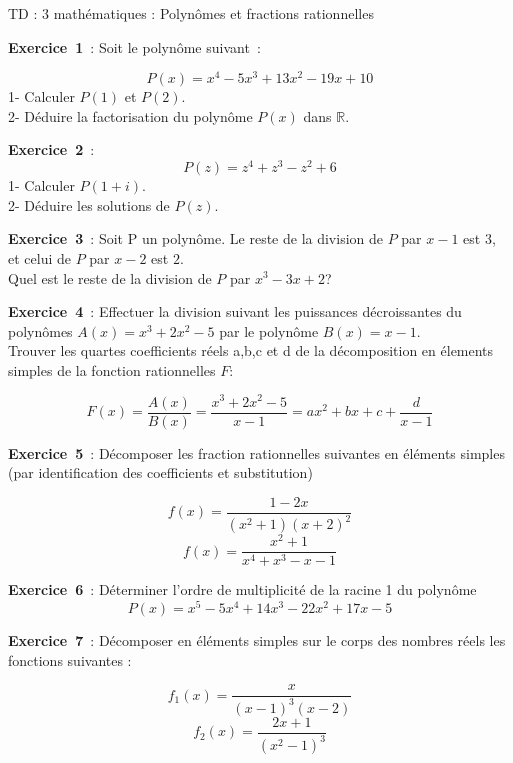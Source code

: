 \documentclass[12pt, a4paper]{article}
\begin{document}
\begin{center}
\large\sc 

TD : 3 mathématiques : Polynômes et fractions rationnelles
\end{center}

{\bf Exercice~1}~: Soit le polynôme suivant~:

\begin{equation*}
P(x) = x^4-5x^3+13x^2-19x+10
\end{equation*}
1- Calculer $P(1)$ et $P(2)$. \\
2- Déduire la factorisation du polynôme $P(x)$ dans $\mathbb{R}$.

{\bf Exercice~2}~:
\begin{equation*}
P(z) = z^4+z^3-z^2+6
\end{equation*}
1- Calculer $P(1+i)$. \\
2- Déduire les solutions de $P(z)$.

{\bf Exercice~3}~: Soit P un polynôme. Le reste de la division de $P$ par $x-1$ est $3$, et celui de $P$ par $x-2$ est $2$. \\
Quel est le reste de la division de $P$ par $x^3-3x+2$?

{\bf Exercice~4}~: Effectuer la division suivant les puissances décroissantes du polynômes $A(x)=x^3+2x^2-5$ par le polynôme $B(x)=x-1$. \\
Trouver les quartes coefficients réels a,b,c et d de la décomposition en élements simples de la fonction rationnelles $F$:

\begin{equation*}
F(x)=\frac{A(x)}{B(x)}=\frac{x^3+2x^2-5}{x-1}=ax^2+bx+c+\frac{d}{x-1}
\end{equation*}

{\bf Exercice~5}~: Décomposer les fraction rationnelles suivantes en éléments simples (par identification des coefficients et substitution)

\begin{equation*}
f(x)=\frac{1-2x}{(x^2+1)(x+2)^2}
\end{equation*}
\begin{equation*}
f(x)=\frac{x^2+1}{x^4+x^3-x-1}
\end{equation*}

{\bf Exercice~6}~: Déterminer l'ordre de multiplicité de la racine 1 du polynôme 
\begin{equation*}
P(x)=x^5-5x^4+14x^3-22x^2+17x-5
\end{equation*}

{\bf Exercice~7}~: Décomposer en éléments simples sur le corps des nombres réels les fonctions suivantes :

\begin{equation*}
f_{1}(x) = \frac{x}{(x-1)^3(x-2)}
\end{equation*}
\begin{equation*}
f_{2}(x) = \frac{2x+1}{(x^2-1)^3}
\end{equation*}
\end{document}
